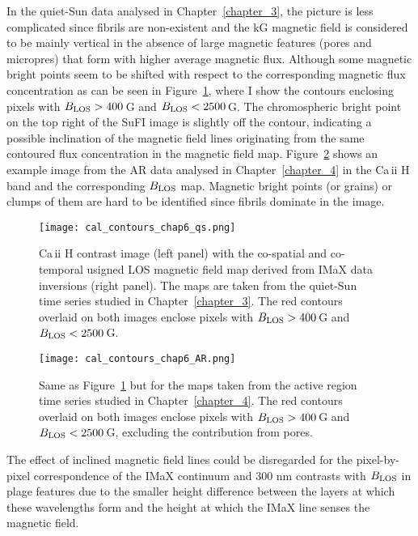 \documentclass[goettingen, gauss, print]{thesis}
\begin{document}
In the quiet-Sun data analysed in Chapter~\ref{chapter_3}, the picture is less complicated since fibrils are non-existent and the kG magnetic field is considered to be mainly vertical in the absence of large magnetic features (pores and micropres) that form with higher average magnetic flux. Although some magnetic bright points seem to be shifted with respect to the corresponding magnetic flux concentration as can be seen in Figure~\ref{cal_contours_qs}, where I show the contours enclosing pixels with $B_{\rm LOS} > 400$\,G and $B_{\rm LOS} <  2500$\,G. The chromospheric bright point on the top right of the SuFI image is slightly off the contour, indicating a possible inclination of the magnetic field lines originating from the same contoured flux concentration in the magnetic field map. Figure~\ref{cal_contours_AR} shows an example image from the AR data analysed in Chapter~\ref{chapter_4} in the Ca\,{\sc ii} H band and the corresponding $B_{\rm LOS}$ map. Magnetic bright points (or grains) or clumps of them are hard to be identified since fibrils dominate in the image. 

\begin{figure}
\centering
\hspace*{-1cm}\texttt{[image: cal\_contours\_chap6\_qs.png]}
\caption{Ca\,{\sc ii} H contrast image (left panel) with the co-spatial and co-temporal usigned LOS magnetic field map derived from IMaX data inversions (right panel). The maps are taken from the quiet-Sun time series studied in Chapter~\ref{chapter_3}. The red contours overlaid on both images enclose pixels with $B_{\rm LOS} > 400$\,G and $B_{\rm LOS} <  2500$\,G.  }
\label{cal_contours_qs}
\end{figure}

\begin{figure}
\centering
\hspace*{-1cm}\texttt{[image: cal\_contours\_chap6\_AR.png]}
\caption{Same as Figure~\ref{cal_contours_qs} but for the maps taken from the active region time series studied in Chapter~\ref{chapter_4}. The red contours overlaid on both images enclose pixels with $B_{\rm LOS} > 400$\,G and $B_{\rm LOS} <  2500$\,G, excluding the contribution from pores.}
\label{cal_contours_AR}
\end{figure}

The effect of inclined magnetic field lines could be disregarded for the pixel-by-pixel correspondence of the IMaX continuum and 300 nm contrasts with $B_{\rm LOS}$ in plage features due to the smaller height difference between the layers at which these wavelengths form and the height at which the IMaX line senses the magnetic field.
\end{document}
